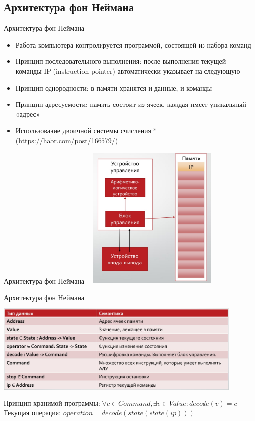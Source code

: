 \subsection{Архитектура фон Неймана}
\begin{frame}[fragile]{Архитектура фон Неймана}
\begin{itemize}
    \item Работа компьютера контролируется программой, состоящей из набора команд
    \item Принцип последовательного выполнения: после выполнения текущей команды IP (instruction pointer) автоматически указывает на следующую
    \item Принцип однородности: в памяти хранятся и данные, и команды
    \item Принцип адресуемости: память состоит из ячеек, каждая имеет уникальный «адрес»
    \item Использование двоичной системы счисления * (\href{https://habr.com/post/166679/}{https://habr.com/post/166679/})
\end{itemize}
\end{frame}

\begin{frame}[fragile]{Архитектура фон Неймана}
\includegraphics[width=7cm, height=7cm]{Term_1/Source/Pirctures/fon.jpg}
\end{frame}

\begin{frame}[fragile]{Архитектура фон Неймана}
\includegraphics[width=12cm, height=5cm]{Term_1/Source/Pirctures/math-fon.jpg}\\
Принцип хранимой программы: $\forall c \in Command, \exists v \in Value : decode(v) = c $
Текущая операция: $operation = decode(state(state(ip)))$
\end{frame}


